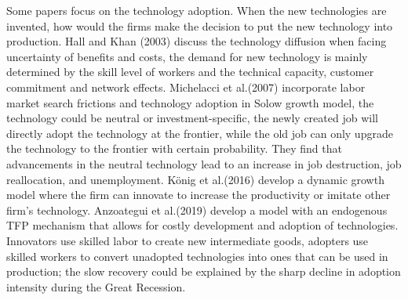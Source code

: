 \documentclass{article}
\newcommand{\1}{\mathbb{1}}
\begin{document}
Some papers focus on the technology adoption. When the new technologies are invented, how would the firms make the decision to put the new technology into production. 
Hall and Khan (2003)\cite{HallKhan2003} discuss the technology diffusion when facing uncertainty of benefits and costs, the demand for new technology is mainly determined by the skill level of workers and the technical capacity, customer commitment and network effects. 
Michelacci et al.(2007)\cite{Michelaccietal2007} incorporate labor market search frictions and technology adoption in Solow growth model, the technology could be neutral or investment-specific, the newly created job will directly adopt the technology at the frontier, while the old job can only upgrade the technology to the frontier with certain probability. They find that advancements in the neutral technology lead to an increase in job destruction, job reallocation, and unemployment. 
K{\"o}nig et al.(2016)\cite{Konigetal2016} develop a dynamic growth model where the firm can innovate to increase the productivity or imitate other firm's technology. 
Anzoategui et al.(2019)\cite{Anzoateguietal2019} develop a model with an endogenous TFP mechanism that allows for costly development and adoption of technologies. Innovators use skilled labor to create new intermediate goods, adopters use skilled workers to convert unadopted technologies into ones that can be used in production; the slow recovery could be explained by the sharp decline in adoption intensity during the Great Recession. \\
\end{document}
